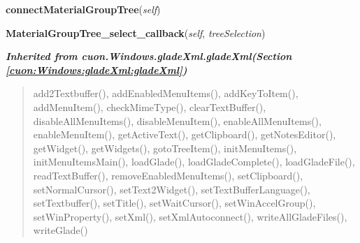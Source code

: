     \label{cuon:Articles:ArticlesFastSelection:ArticlesFastSelection:connectMaterialGroupTree}

    \vspace{0.5ex}

\hspace{.8\funcindent}\begin{boxedminipage}{\funcwidth}

    \raggedright \textbf{connectMaterialGroupTree}(\textit{self})

\setlength{\parskip}{2ex}
\setlength{\parskip}{1ex}
    \end{boxedminipage}

    \label{cuon:Articles:ArticlesFastSelection:ArticlesFastSelection:MaterialGroupTree_select_callback}

    \vspace{0.5ex}

\hspace{.8\funcindent}\begin{boxedminipage}{\funcwidth}

    \raggedright \textbf{MaterialGroupTree\_select\_callback}(\textit{self}, \textit{treeSelection})

\setlength{\parskip}{2ex}
\setlength{\parskip}{1ex}
    \end{boxedminipage}


\large{\textbf{\textit{Inherited from cuon.Windows.gladeXml.gladeXml\textit{(Section \ref{cuon:Windows:gladeXml:gladeXml})}}}}

\begin{quote}
add2Textbuffer(), addEnabledMenuItems(), addKeyToItem(), addMenuItem(), checkMimeType(), clearTextBuffer(), disableAllMenuItems(), disableMenuItem(), enableAllMenuItems(), enableMenuItem(), getActiveText(), getClipboard(), getNotesEditor(), getWidget(), getWidgets(), gotoTreeItem(), initMenuItems(), initMenuItemsMain(), loadGlade(), loadGladeComplete(), loadGladeFile(), readTextBuffer(), removeEnabledMenuItems(), setClipboard(), setNormalCursor(), setText2Widget(), setTextBufferLanguage(), setTextbuffer(), setTitle(), setWaitCursor(), setWinAccelGroup(), setWinProperty(), setXml(), setXmlAutoconnect(), writeAllGladeFiles(), writeGlade()
\end{quote}

